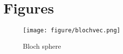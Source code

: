 \chapter{Figures}

\vspace*{-3in}

\begin{figure}
\texttt{[image: figure/blochvec.png]}
\caption{Bloch sphere}
\label{fig1}
\end{figure}
\clearpage
\newpage


